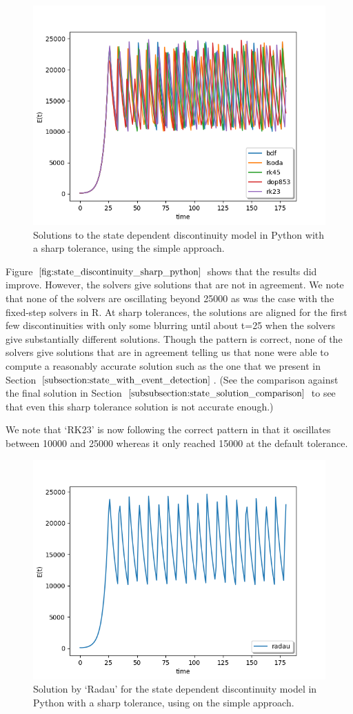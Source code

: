\begin{figure}[H]
\centering
\includegraphics[width=0.7\linewidth]{./figures/state_discontinuity_sharp_py}
\caption{Solutions to the state dependent discontinuity model in Python with a sharp tolerance, using the simple approach.}
\label{fig:state_discontinuity_sharp_python}
\end{figure}

Figure $\ref{fig:state_discontinuity_sharp_python}$ shows that the results did improve. However, the solvers give solutions that are not in agreement. We note that none of the solvers are oscillating beyond 25000 as was the case with the fixed-step solvers in R. At sharp tolerances, the solutions are aligned for the first few discontinuities with only some blurring until about t=25 when the solvers give substantially different solutions. Though the pattern is correct, none of the solvers give solutions that are in agreement telling us that none were able to compute a reasonably accurate solution such as the one that we present in Section $\ref{subsection:state_with_event_detection}$. (See the comparison against the final solution in Section $\ref{subsubsection:state_solution_comparison}$ to see that even this sharp tolerance solution is not accurate enough.)

We note that `RK23' is now following the correct pattern in that it oscillates between 10000 and 25000 whereas it only reached 15000 at the default tolerance. 

\begin{figure}[H]
\centering
\includegraphics[width=0.7\linewidth]{./figures/state_discontinuity_sharp_radau_py}
\caption{Solution by `Radau' for the state dependent discontinuity model in Python with a sharp tolerance, using on the simple approach.}
\label{fig:state_discontinuity_sharp_radau_py}
\end{figure}

